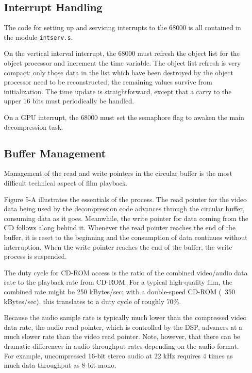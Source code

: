 \documentclass[12pt,letterpaper,twoside]{article}
\begin{document}
\subsection{Interrupt Handling}
The code for setting up and servicing interrupts to the 68000 is all contained in the module \texttt{intserv.s}.

On the vertical interval interrupt, the 68000 must refresh the object list for the object processor and increment the time variable. The object list refresh is very compact: only those data in the list which have been destroyed by the object processor need to be reconstructed; the remaining values survive from initialization. The time update is straightforward, except that a carry to the upper 16 bits must periodically be handled.

On a GPU interrupt, the 68000 must set the semaphore flag to awaken the main decompression task.

\subsection{Buffer Management}
Management of the read and write pointers in the circular buffer is the most difficult technical aspect of film playback.

Figure 5-A illustrates the essentials of the process. The read pointer for the video data being used by the decompression code advances through the circular buffer, consuming data as it goes. Meanwhile, the write pointer for data coming from the CD follows along behind it. Whenever the read pointer reaches the end of the buffer, it is reset to the beginning and the consumption of data continues without interruption. When the write pointer reaches the end of the buffer, the write process is suspended.

The duty cycle for CD-ROM access is the ratio of the combined video/audio data rate to the playback rate from CD-ROM. For a typical high-quality film, the combined rate might be 250 kBytes/sec; with a double-speed CD-ROM (~350 kBytes/sec), this translates to a duty cycle of roughly 70\%.

Because the audio sample rate is typically much lower than the compressed video data rate, the audio read pointer, which is controlled by the DSP, advances at a much slower rate than the video read pointer. Note, however, that there can be dramatic differences in audio throughput rates depending on the audio format. For example, uncompressed 16-bit stereo audio at 22 kHz requires 4 times as much data throughput as 8-bit mono.
\end{document}
